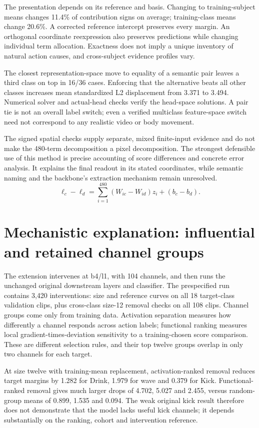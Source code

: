 \documentclass[11pt]{article}
\begin{document}
The presentation depends on its reference and basis. Changing to training-subject means changes 11.4\% of contribution signs on average; training-class means change 20.6\%. A corrected reference intercept preserves every margin. An orthogonal coordinate reexpression also preserves predictions while changing individual term allocation. Exactness does not imply a unique inventory of natural action causes, and cross-subject evidence profiles vary.

The closest representation-space move to equality of a semantic pair leaves a third class on top in 16/36 cases. Enforcing that the alternative beats all other classes increases mean standardized L2 displacement from 3.371 to 3.494. Numerical solver and actual-head checks verify the head-space solutions. A pair tie is not an overall label switch; even a verified multiclass feature-space switch need not correspond to any realistic video or body movement.

The signed spatial checks supply separate, mixed finite-input evidence and do not make the 480-term decomposition a pixel decomposition. The strongest defensible use of this method is precise accounting of score differences and concrete error analysis. It explains the final readout in its stated coordinates, while semantic naming and the backbone's extraction mechanism remain unresolved.
\[\ell_c-\ell_d = \sum_{i=1}^{480}(W_{ic}-W_{id})z_i+(b_c-b_d).\]

\section{Mechanistic explanation: influential and retained channel groups}
The extension intervenes at b4/l1, with 104 channels, and then runs the unchanged original downstream layers and classifier. The prespecified run contains 3,420 interventions: size and reference curves on all 18 target-class validation clips, plus cross-class size-12 removal checks on all 108 clips. Channel groups come only from training data. Activation separation measures how differently a channel responds across action labels; functional ranking measures local gradient-times-deviation sensitivity to a training-chosen score comparison. These are different selection rules, and their top twelve groups overlap in only two channels for each target.

At size twelve with training-mean replacement, activation-ranked removal reduces target margins by 1.282 for Drink, 1.979 for wave and 0.379 for Kick. Functional-ranked removal gives much larger drops of 4.702, 5.027 and 2.455, versus random-group means of 0.899, 1.535 and 0.094. The weak original kick result therefore does not demonstrate that the model lacks useful kick channels; it depends substantially on the ranking, cohort and intervention reference.
\end{document}
